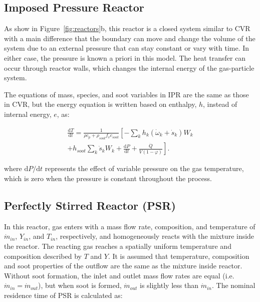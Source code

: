 \subsection{Imposed Pressure Reactor}

As show in Figure~\ref{fig:reactors}b, this reactor is a closed system similar to CVR with a main difference that the boundary can move and change the volume of the system due to an external pressure that can stay constant or vary with time. In either case, the pressure is known a priori in this model. The heat transfer can occur through reactor walls, which changes the internal energy of the gas-particle system.

The equations of mass, species, and soot variables in IPR are the same as those in CVR, but the energy equation is written based on enthalpy, $h$, instead of internal energy, $e$, as:

\begin{equation}
	\begin{split}
		\frac{\mathrm{d} T}{\mathrm{d} t}=
		\frac{1}{\rho c_p+\rho_{soot}f_v c_{soot}}
		\left[
		-\sum_k h_k
		\left(
		\dot{\omega}_k+\dot{s}_k
		\right) W_k \right. \\
		\left.
		+h_{soot}\sum_k \dot{s}_k W_k
		+\frac{\mathrm{d}P}{\mathrm{d}t}
		+\frac{\dot{Q}}{V(1-\varphi)}
		\right]
		\label{eqn:energypressure}.
	\end{split}
\end{equation}


\noindent where $\mathrm{d}P/\mathrm{d}t$ represents the effect of variable pressure on the gas temperature, which is zero when the pressure is constant throughout the process.


\subsection{Perfectly Stirred Reactor (PSR)}
In this reactor, gas enters with a mass flow rate, composition, and temperature of $\dot{m}_{in}$, $Y_{in}$, and $T_{in}$, respectively, and homogeneously reacts with the mixture inside the reactor. The reacting gas reaches a spatially uniform temperature and composition described by $T$ and $Y$. It is assumed that temperature, composition and soot properties of the outflow are the same as the mixture inside reactor. Without soot formation, the inlet and outlet mass flow rates are equal (i.e. ${\dot{m}_{in}}={\dot{m}_{out}}$), but when soot is formed, ${\dot{m}_{out}}$ is slightly less than ${\dot{m}_{in}}$. The nominal residence time of PSR is calculated as:


